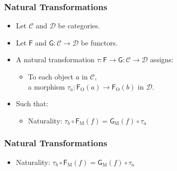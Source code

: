 \documentclass{beamer}
\DeclareMathOperator{\obj}{O}
\DeclareMathOperator{\mor}{M}
\newcommand{\comp}{\ensuremath{\mathrel{\circ}}}
\newcommand{\cat}[1]{\ensuremath{\mathcal{#1}}}
\newcommand{\func}[1]{\ensuremath{\mathsf{#1}}}
\newcommand{\funcO}[1]{\ensuremath{\func{#1}_{\obj}}}
\newcommand{\funcM}[1]{\ensuremath{\func{#1}_{\mor}}}
\newcommand{\nat}[1]{\ensuremath{#1}}
\newcommand{\natO}[2]{\ensuremath{\nat{#1}_{#2}}}
\begin{document}
\begin{frame}[label={def:natural}]
  \frametitle{Natural Transformations}

  \begin{definition}
    \begin{itemize}
    \item
      Let \cat{C} and \cat{D} be categories.
    \item
      Let \func{F} and $\func{G}: \cat{C} \to \cat{D}$ be functors.
    \item
      A natural transformation $\nat{\tau}: \func{F} \to \func{G}:
      \cat{C} \to \cat{D}$ assigns:
      \begin{itemize}
      \item
        To each object $a$ in \cat{C},\\ a morphism $\natO{\tau}{a}:
        \funcO{F}(a) \to \funcO{F}(b)$ in \cat{D}.
      \end{itemize}
    \item
      Such that:
      \begin{itemize}
      \item
        Naturality: $\natO{\tau}{b} \comp \funcM{F}(f) = \funcM{G}(f)
        \comp \natO{\tau}{a}$
      \end{itemize}
    \end{itemize}
  \end{definition}

\end{frame}


\begin{frame}
  \frametitle{Natural Transformations}

  \begin{definition}
    \begin{itemize}
    \item
      Naturality: $\natO{\tau}{b} \comp \funcM{F}(f) = \funcM{G}(f)
      \comp \natO{\tau}{a}$
    \end{itemize}
  \end{definition}
  \begin{center}
  \end{center}

\end{frame}
\end{document}
